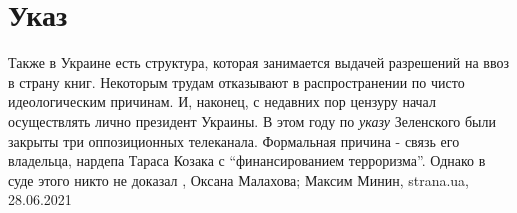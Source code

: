  
 
 
 
 
\chapter{Указ}

Также в Украине есть структура, которая занимается выдачей разрешений на ввоз в
страну книг. Некоторым трудам отказывают в распространении по чисто
идеологическим причинам.  И, наконец, с недавних пор цензуру начал осуществлять
лично президент Украины. В этом году по \emph{указу} Зеленского были закрыты три
оппозиционных телеканала. Формальная причина - связь его владельца, нардепа
Тараса Козака с \enquote{финансированием терроризма}. Однако в суде этого никто не
доказал
, 
Оксана Малахова; Максим Минин, strana.ua, 28.06.2021

